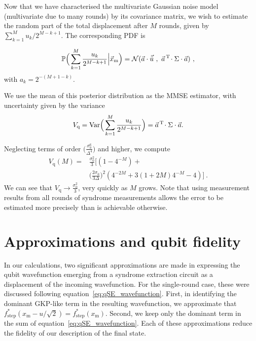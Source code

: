 \documentclass[prx,reprint,superscriptaddress,longbibliography,floatfix,nofootinbib]{revtex4-1}
\begin{document}
Now that we have characterised the multivariate Gaussian noise model (multivariate due to many rounds) by its covariance matrix, we wish to estimate the random part of the total displacement after $M$ rounds, given by $\sum_{k=1}^M u_k/2^{M-k+1}$. The corresponding PDF is 

\begin{equation}
\mathbb{P}\Big(\sum_{k=1}^{M}\frac{ u_k}{2^{M-k+1}}\Big|\vec{x}_{\text{m}}\Big) = \mathcal{N}(\vec{a}\cdot\vec{\tilde{u}} \ , \ \vec{a}^{\hspace{0.05cm}\text{T}}\hspace{-0.05cm} 
   \cdot\Sigma\cdot
    \vec{a}) \ ,
\end{equation}
\noindent with $a_{k} = 2^{-(M+1-k)}$.

We use the mean of this posterior distribution as the MMSE estimator, with uncertainty given by the variance 
\begin{equation}
   V_\text{q}=\text{Var}\Big(\sum_{k=1}^{M}\frac{u_k}{2^{M-k+1}}\Big) = \vec{a}^{\hspace{0.05cm}\text{T}}\hspace{-0.05cm} 
   \cdot\Sigma\cdot
    \vec{a}.
\end{equation}

\noindent Neglecting terms of order $\big(\frac{\sigma_0^6}{\Delta^4}\big)$ and higher, we compute 
\begin{equation}
\begin{split}
    \label{eq:var_q_multiple_steps2}
V_\text{q}(M) = & \frac{\sigma_{0}^2}{3}\Big[(1-4^{-M}) + \\ 
& \Big(\frac{2\sigma_0}{3\Delta}\Big)^{2}(4^{-2M} + 3(1+2M)4^{-M} -4)\Big] \ .
\end{split}
\end{equation}
\noindent We can see that $V_\text{q} \rightarrow \frac{\sigma_{0}^2}{3}$, very quickly as $M$ grows. Note that using measurement results from all rounds of syndrome measurements allows the error to be estimated more precisely than is achievable otherwise. 
\section{Approximations and qubit fidelity}
\label{appendix-success-prob}
In our calculations, two significant approximations are made in expressing the qubit wavefunction emerging from a syndrome extraction circuit as a displacement of the incoming wavefunction. For the single-round case, these were discussed following equation~\eqref{eq:qSE_wavefunction}. First, in identifying the dominant GKP-like term in the resulting wavefunction, we approximate that $f_\text{step}^{*}(x_\text{m}-u/\sqrt{2})=f_\text{step}^{*}(x_\text{m})$. Second, we keep only the dominant term in the sum of equation~\eqref{eq:qSE_wavefunction}. Each of these approximations reduce the fidelity of our description of the final state.
\end{document}
